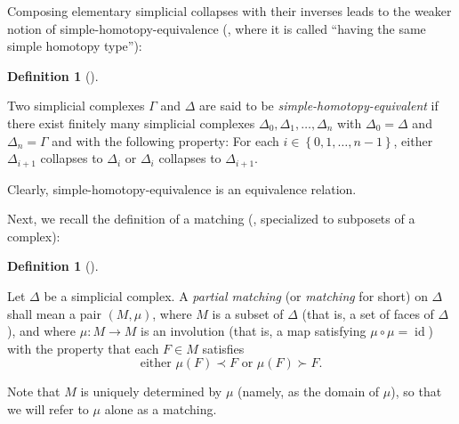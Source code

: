 \documentclass[numbers=enddot,12pt,final,onecolumn,notitlepage]{scrartcl}%
\theoremstyle{definition}
\newtheorem{defi}[theo]{Definition}
\newenvironment{definition}[1][]
{\begin{defi}[#1]\begin{leftbar}}
{\end{leftbar}\end{defi}}
\newcommand{\set}[1]{\left\{ #1 \right\}}
\begin{document}
Composing elementary simplicial collapses with
their inverses leads to the weaker notion of
simple-homotopy-equivalence
(\cite[Definition 9.26]{Kozlov20}, where it is called
``having the same simple homotopy type''):

\begin{definition}
  \label{def.simple.homotopy.equivalence}

  Two simplicial complexes $\Gamma$ and $\Delta$ are said to be \emph{simple-homotopy-equivalent} if
  there exist finitely many simplicial complexes $\Delta_0, \Delta_1, \dots, \Delta_n$
  with $\Delta_0 = \Delta$ and $\Delta_n = \Gamma$ and with the following property:
  For each $i \in \set{0, 1, \dots, n-1}$,
  either $\Delta_{i+1}$ collapses to $\Delta_i$ or $\Delta_i$ collapses to $\Delta_{i+1}$.
\end{definition}

Clearly, simple-homotopy-equivalence is an equivalence relation.

Next, we recall the definition of a matching (\cite[Definition 10.6]{Kozlov20},
specialized to subposets of a complex):

\begin{definition}
\label{def.parmat} Let $\Delta$ be a simplicial complex. A \emph{partial
matching} (or \emph{matching} for short) on $\Delta$ shall mean a pair
$\left(  M,\mu\right)  $, where $M$ is a subset of $\Delta$ (that is, a set of
faces of $\Delta$), and where $\mu:M\rightarrow M$ is an involution (that is,
a map satisfying $\mu\circ\mu=\operatorname*{id}$) with the property that each
$F\in M$ satisfies%
\[
\text{either }\mu\left(  F\right)  \prec F\text{ or }\mu\left(  F\right)
\succ F.
\]


Note that $M$ is uniquely determined by $\mu$ (namely, as the domain of $\mu
$), so that we will refer to $\mu$ alone as a matching.
\end{definition}
\end{document}
